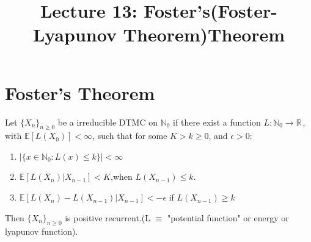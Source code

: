 \documentclass[a4paper,10pt,english]{article}
\title{Lecture 13: Foster's(Foster-Lyapunov Theorem)Theorem}
\date{}%
\author{}
\begin{document}
\maketitle
\section{Foster's Theorem}
\begin{thm}[Foster,1950]
Let $\{X_n\}_{n \geq 0}$ be a irreducible DTMC on $\mathbb{N}_0$ if there exist a function $L : \mathbb{N}_0 \longrightarrow \mathbb{R}_+$ with $\mathbb{E}[L(X_0)] < \infty$, such that for some $K>k\geq0$, and $\epsilon>0$:
\begin{enumerate}
\item $|\{x \in \mathbb{N}_0 : L(x) \leq k\}| < \infty$
\item $\mathbb{E}[L(X_n)|X_{n-1}] < K$,when $L(X_{n-1}) \leq k$.
\item $\mathbb{E}[L(X_n)-L(X_{n-1})|X_{n-1}] < -\epsilon$ if $L(X_{n-1})\geq k$
\end{enumerate}
Then $\{X_n\}_{n \geq 0}$ is positive recurrent.(L $\equiv$ "potential function" or energy or lyapunov function).
\end{thm}
\end{document}
